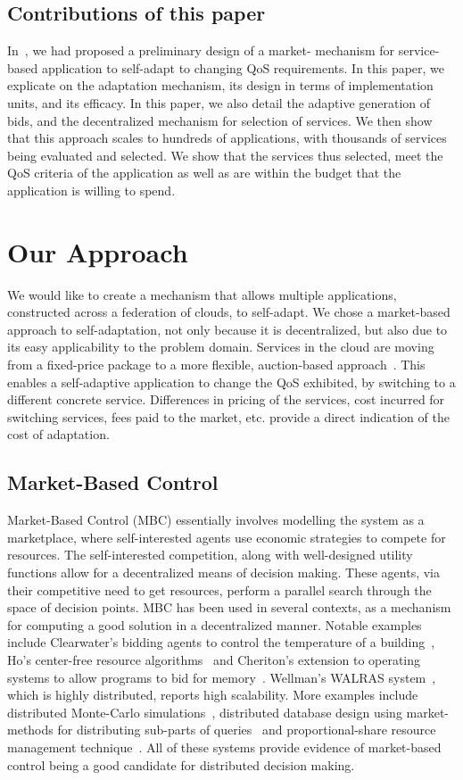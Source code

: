 \documentclass[10pt,journal,compsoc]{IEEEtran}
\begin{document}
\subsection{Contributions of this paper}
In~\cite{Nallur2010Design}, we had proposed a preliminary design of a market- mechanism for service-based application to self-adapt to changing QoS requirements. In this paper, we explicate on the adaptation mechanism, its design in terms of implementation units, and its efficacy.  In this paper, we also detail the adaptive generation of bids, and the decentralized mechanism for selection of services. We then show that this approach scales to hundreds of applications, with thousands of services being evaluated and selected. We show that the services thus selected, meet the QoS criteria of the application as well as are within the budget that the application is willing to spend. 
  
\section{Our Approach}
We would like to create a mechanism that allows multiple applications, constructed across a federation of clouds, to self-adapt. We chose a market-based approach to self-adaptation, not only because it is decentralized, but also due to its easy applicability to the problem domain. Services in the cloud are moving from a fixed-price package to a more flexible, auction-based approach~\cite{Amazon2010SpotInstance}. This enables a self-adaptive application to change the QoS exhibited, by switching to a different concrete service. Differences in pricing of the services, cost incurred for switching services, fees paid to the market, etc. provide a direct indication of the cost of adaptation. 
\subsection{Market-Based Control}
Market-Based Control (MBC) essentially involves modelling the system as a marketplace, where self-interested agents use economic strategies to compete for resources. The self-interested competition, along with well-designed utility functions allow for a decentralized means of decision making. These agents, via their competitive need to get resources, perform a parallel search through the space of decision points. MBC has been used in several contexts, as a mechanism for computing a good solution in a decentralized manner. Notable examples include Clearwater's bidding agents to control the temperature of a building~\cite{Clearwater1996Saving}, Ho's center-free resource algorithms~\cite{Ho1980class} and Cheriton's extension to operating systems to allow programs to bid for memory~\cite{Harty1996market}. Wellman's WALRAS system~\cite{Wellman1993market-oriented}, which is highly distributed, reports high scalability. More examples include distributed Monte-Carlo simulations~\cite{Waldspurger1992Spawn}, distributed database design using market-methods for distributing sub-parts of queries~\cite{Stonebraker1994Economic} and proportional-share resource management technique~\cite{Waldspurger1994Lottery}. All of these systems provide evidence of market-based control being a good candidate for distributed decision making. 
\end{document}
